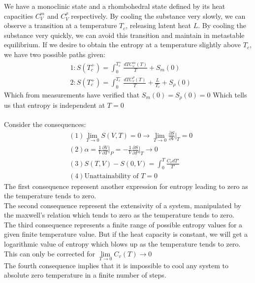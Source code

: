 \documentclass[12pt,a4paper]{article}
\begin{document}
\begin{enumerate}
    We have a monoclinic state and a rhombohedral state defined by its heat capacities $C_V^m$ and $C_V^{\rho}$ respectively. By cooling the substance very slowly, we can observe a transition at a temperature $T_c$, releasing latent heat $L$. By cooling the substance very quickly, we can avoid this transition and maintain in metastable equilibrium. If we desire to obtain the entropy at a temperature slightly above $T_c$, we have two possible paths given:
    \begin{align*}
    &1: S(T_c^{+}) = \int_{0}^{T_c^{+}}\frac{dTC_v^{m}(T)}{T} + S_m(0)\\
    &2: S(T_c^{+}) = \int_{0}^{T_c^{-}}\frac{dTC_v^{\rho}(T)}{T} + \frac{L}{T_c} + S_\rho(0)
    \end{align*}
    Which from measurements have verified that $S_m(0) = S_\rho(0)  = 0$ Which tells us that entropy is independent at $T = 0$\\
    \\
    Consider the consequences:
    \begin{align*}
    &(1) \lim\limits_{T\rightarrow 0}S(V,T) = 0  \rightarrow \lim\limits_{T\rightarrow 0}\frac{\partial S}{\partial V}\bigg|_T =0\\
    &(2) \alpha = \frac{1}{V}\frac{\partial V}{\partial T}\bigg|_P = -\frac{1}{V}\frac{\partial S}{\partial P}\bigg|_T \rightarrow 0\\
    &(3) S(T,V) - S(0,V) = \int_{0}^{T}\frac{C_vdT'}{T'}\\
    &(4) \text{Unattainability of $T=0$}
    \end{align*}
    The first consequence represent another expression for entropy leading to zero as the temperature tends to zero.\\
    The second consequence represent the extensivity of a system, manipulated by the maxwell's relation which tends to zero as the temperature tends to zero.\\
    The third consequence represents a finite range of possible entropy values for a given finite temperature value. But if the heat capacity is constant, we will get a logarithmic value of entropy which blows up as the temperature tends to zero. This can only be corrected for $\lim\limits_{T\rightarrow 0} C_v(T) \rightarrow 0$\\
    The fourth consequence implies that it is impossible to cool any system to absolute zero temperature in a finite number of steps. 
\end{enumerate}
	
\end{document}
